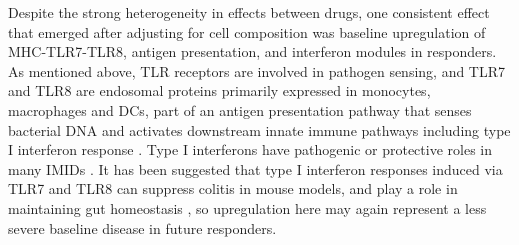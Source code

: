 Despite the strong heterogeneity in effects between drugs, one consistent effect that emerged after adjusting for cell composition was 
baseline upregulation of MHC-TLR7-TLR8, antigen presentation, and interferon modules in responders.
As mentioned above, \gls{TLR} receptors are involved in pathogen sensing, and TLR7 and TLR8 are endosomal proteins primarily expressed in monocytes, macrophages and \glspl{DC},
part of an antigen presentation pathway that senses bacterial DNA and activates downstream innate immune pathways including type I interferon response \autocite{cervantes2012TLR8ForgottenRelative}.
Type I interferons have pathogenic or protective roles in many \glspl{IMID} \autocite{ivashkiv2014RegulationTypeInterferon}.
It has been suggested that type I interferon responses induced via TLR7 and TLR8 can suppress colitis in mouse models, and play a role in maintaining gut homeostasis \autocite{lu2018TolllikeReceptorsInflammatory,corridoni2018EmergingMechanismsInnate},
so upregulation here may again represent a less severe baseline disease in future responders.
%


